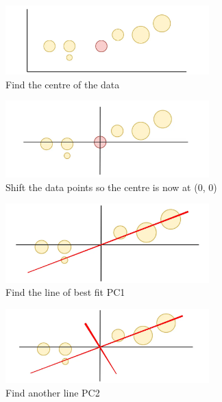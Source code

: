\documentclass{article}
\begin{document}
\begin{figure}[H]
    \centering
    \includegraphics[width=0.7\textwidth]{Img/1_1BiMkGksH0JBOEOlf1tBTg.png}
    \caption{Find the centre of the data}
\end{figure}

\begin{figure}[H]
    \centering
    \includegraphics[width=0.7\textwidth]{Img/1_m3gnAUA9dBFQlbgWAziu3A.png}
    \caption{Shift the data points so the centre is now at (0, 0)}
\end{figure}

\begin{figure}[H]
    \centering
    \includegraphics[width=0.7\textwidth]{Img/1_OjfIsQ5mxzfWoh3wtoBDBA.png}
    \caption{Find the line of best fit PC1}
\end{figure}

\begin{figure}[H]
    \centering
    \includegraphics[width=0.7\textwidth]{Img/1_oRj5G874ukOev-uLrsq7LQ.png}
    \caption{Find another line PC2}
\end{figure}
\end{document}
